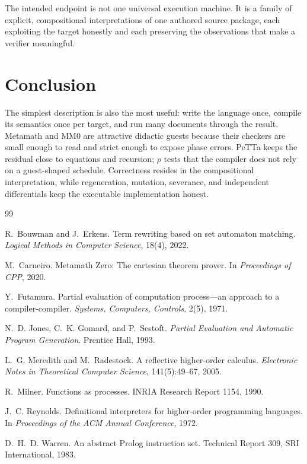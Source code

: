 \documentclass[11pt]{article}
\theoremstyle{remark}
\begin{document}
The intended endpoint is not one universal execution machine.  It is a family
of explicit, compositional interpretations of one authored source package,
each exploiting the target honestly and each preserving the observations that
make a verifier meaningful.

\section{Conclusion}

The simplest description is also the most useful: write the language once,
compile its semantics once per target, and run many documents through the
result.  Metamath and MM0 are attractive didactic guests because their checkers
are small enough to read and strict enough to expose phase errors.  PeTTa keeps
the residual close to equations and recursion; $\rho$ tests that the compiler
does not rely on a guest-shaped schedule.  Correctness resides in the
compositional interpretation, while regeneration, mutation, severance, and
independent differentials keep the executable implementation honest.

\begin{thebibliography}{99}

R.~Bouwman and J.~Erkens.
\newblock Term rewriting based on set automaton matching.
\newblock \emph{Logical Methods in Computer Science}, 18(4), 2022.

M.~Carneiro.
\newblock Metamath Zero: The cartesian theorem prover.
\newblock In \emph{Proceedings of CPP}, 2020.

Y.~Futamura.
\newblock Partial evaluation of computation process---an approach to a
compiler-compiler.
\newblock \emph{Systems, Computers, Controls}, 2(5), 1971.

N.~D. Jones, C.~K. Gomard, and P.~Sestoft.
\newblock \emph{Partial Evaluation and Automatic Program Generation}.
\newblock Prentice Hall, 1993.

L.~G. Meredith and M.~Radestock.
\newblock A reflective higher-order calculus.
\newblock \emph{Electronic Notes in Theoretical Computer Science},
141(5):49--67, 2005.

R.~Milner.
\newblock Functions as processes.
\newblock INRIA Research Report 1154, 1990.

J.~C. Reynolds.
\newblock Definitional interpreters for higher-order programming languages.
\newblock In \emph{Proceedings of the ACM Annual Conference}, 1972.

D.~H.~D. Warren.
\newblock An abstract Prolog instruction set.
\newblock Technical Report 309, SRI International, 1983.

\end{thebibliography}
\end{document}
